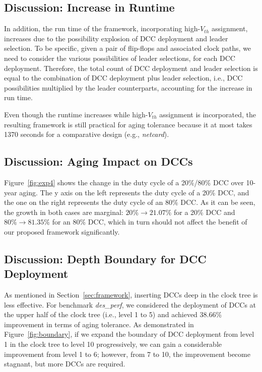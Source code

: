 \subsection{Discussion: Increase in Runtime}
In addition, the run time of the framework, incorporating high-$V_{th}$ assignment, increases due to the possibility explosion of DCC deployment and leader selection. To be specific, given a pair of flip-flops and associated clock paths, we need to consider the various possibilities of leader selections, for each DCC deployment. Therefore, the total  count of DCC deployment and leader selection is equal to the combination of DCC deployment plus leader selection, i.e., DCC possibilities multiplied by the leader counterparts, accounting for the increase in run time. 

Even though the runtime increases while high-$V_{th}$ assignment is incorporated, the resulting framework is still practical for aging tolerance because it at most takes 1370 seconds for a comparative design (e.g., \textit{netcard}).
\subsection{Discussion: Aging Impact on DCCs}


Figure~\ref{fig:exp4} shows the change in the duty cycle of a 20\%/80\% DCC over 10-year aging. The y axis on the left represents the duty cycle of a 20\% DCC, and the one on the right represents the duty cycle of an 80\% DCC. As it can be seen, the growth in both cases are marginal: $20\% \to 21.07\%$ for a 20\% DCC and $80\% \to 81.35\%$ for an 80\% DCC, which in turn should not affect the benefit of our proposed framework significantly.


\subsection{Discussion: Depth Boundary for DCC Deployment}

As mentioned in Section~\ref{sec:framework}, inserting DCCs deep in the clock tree is less effective. For benchmark \textit{des\_perf}, we considered the deployment of DCCs at the upper half of the clock tree (i.e., level 1 to 5) and achieved 38.66\% improvement in terms of aging tolerance. As demonstrated in Figure~\ref{fig:boundary}, if we expand the boundary of DCC deployment from level 1 in the clock tree to level 10 progressively, we can gain a considerable improvement from level 1 to 6; however, from 7 to 10, the improvement become stagnant, but more DCCs are required.


